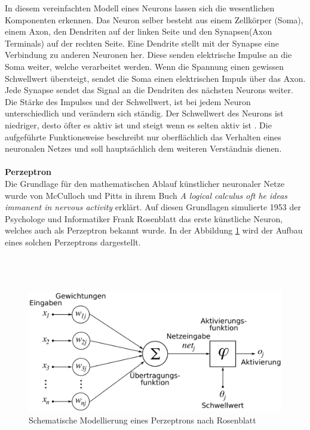 In diesem vereinfachten Modell eines Neurons lassen sich die wesentlichen Komponenten erkennen. Das Neuron selber besteht aus einem Zellkörper (Soma), einem Axon, den Dendriten auf der linken Seite und den Synapsen(Axon Terminals) auf der rechten Seite. Eine Dendrite stellt mit der Synapse eine Verbindung zu anderen Neuronen her. Diese senden elektrische Impulse an die Soma weiter, welche verarbeitet werden. Wenn die Spannung einen gewissen Schwellwert übersteigt, sendet die Soma einen elektrischen Impuls über das Axon. Jede Synapse sendet das Signal an die Dendriten des nächsten Neurons weiter. Die Stärke des Impulses und der Schwellwert, ist bei jedem Neuron unterschiedlich und verändern sich ständig. Der Schwellwert des Neurons ist niedriger, desto öfter es aktiv ist und steigt wenn es selten aktiv ist \cite{schmidt2013physiologie}. Die aufgeführte Funktionsweise beschreibt nur oberflächlich das Verhalten eines neuronalen Netzes und soll hauptsächlich dem weiteren Verständnis dienen.\\\\
\textbf{Perzeptron}\\
Die Grundlage für den mathematischen Ablauf künstlicher neuronaler Netze wurde von McCulloch und Pitts in ihrem Buch \textit{A logical calculus oft he ideas immanent in nervous activity} erklärt. Auf diesen Grundlagen simulierte 1953 der Psychologe und Informatiker Frank Rosenblatt das erste künstliche Neuron, welches auch als Perzeptron bekannt wurde. In der Abbildung \ref{img:Perzeptron} wird der Aufbau eines solchen Perzeptrons dargestellt.\\\\\\\\
\begin{figure}
	[h]
	\centering
	\includegraphics[scale=0.3]{Sources/perzeptron2.png}
	\caption{Schematische Modellierung eines Perzeptrons nach Rosenblatt \cite{perzeptron2019}}
	\label{img:Perzeptron}
\end{figure}\\
